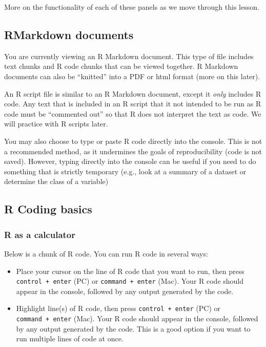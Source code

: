 \documentclass[
]{article}
\begin{document}
More on the functionality of each of these panels as we move through
this lesson.

\hypertarget{rmarkdown-documents}{%
\subsection{RMarkdown documents}\label{rmarkdown-documents}}

You are currently viewing an R Markdown document. This type of file
includes text chunks and R code chunks that can be viewed together. R
Markdown documents can also be ``knitted'' into a PDF or html format
(more on this later).

An R script file is similar to an R Markdown document, except it
\emph{only} includes R code. Any text that is included in an R script
that it not intended to be run as R code must be ``commented out'' so
that R does not interpret the text as code. We will practice with R
scripts later.

You may also choose to type or paste R code directly into the console.
This is not a recommended method, as it undermines the goals of
reproducibility (code is not saved). However, typing directly into the
console can be useful if you need to do something that is strictly
temporary (e.g., look at a summary of a dataset or determine the class
of a variable)

\hypertarget{r-coding-basics}{%
\subsection{R Coding basics}\label{r-coding-basics}}

\hypertarget{r-as-a-calculator}{%
\subsubsection{R as a calculator}\label{r-as-a-calculator}}

Below is a chunk of R code. You can run R code in several ways:

\begin{itemize}
\item
  Place your cursor on the line of R code that you want to run, then
  press \texttt{control\ +\ enter} (PC) or \texttt{command\ +\ enter}
  (Mac). Your R code should appear in the console, followed by any
  output generated by the code.
\item
  Highlight line(s) of R code, then press \texttt{control\ +\ enter}
  (PC) or \texttt{command\ +\ enter} (Mac). Your R code should appear in
  the console, followed by any output generated by the code. This is a
  good option if you want to run multiple lines of code at once.
\end{itemize}
\end{document}
